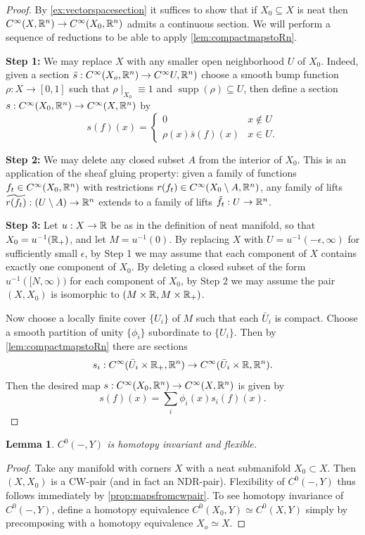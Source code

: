 \documentclass{article}
\newtheorem{lemma}[theorem]{Lemma}
\newtheorem{proposed work}[theorem]{Proposed Work}
\begin{document}
\begin{proof}
  By \ref{ex:vectorspacesection} it suffices to show that if
  $X_0\subseteq X$ is neat then
  $C^\infty(X,\mathbb R^n) \to C^\infty(X_0, \mathbb R^n)$ admits a continuous
  section. We will perform a sequence of reductions to be able to
  apply \ref{lem:compactmapstoRn}.

  {\bf Step 1:} We may replace $X$ with any smaller open neighborhood
  $U$ of $X_0$. Indeed, given a section $\bar s: C^\infty(X_o,
  \mathbb R^n) \to C^\infty U, \mathbb R^n)$ choose a smooth bump function
  $\rho: X\to [0,1]$ such that $\rho\mid_{X_0} \equiv 1$ and
  $\operatorname{supp}(\rho)\subseteq U$, then define a section
  $s:C^\infty(X_0, \mathbb R^n) \to C^\infty(X, \mathbb R^n)$ by
  \[
    s(f)(x) = \begin{cases} 0 &x\notin U\\ \rho(x) \bar s(f)(x) & x\in
      U. 
    \end{cases}
  \]

  {\bf Step 2:} We may delete any closed subset $A$ from the interior
  of $X_0$. This is an application of the sheaf gluing property: given
  a family of functions $f_t \in C^\infty(X_0, \mathbb R^n)$ with
  restrictions $r(f_t) \in C^\infty(X_0\setminus A, \mathbb R^n)$, any family
  of lifts $\widetilde{r(f_t)} : (U\setminus A)\to \mathbb R^n$ extends to a
  family of lifts $\tilde f_t : U\to \mathbb R^n$.

  {\bf Step 3:} Let $u:X\to \mathbb R$ be as in the definition of neat
  manifold, so that $X_0 = u^{-1}(\mathbb R_+)$, and let $M = u^{-1}(0)$. By
  replacing $X$ with $U = u^{-1}(-\epsilon,\infty)$ for sufficiently
  small $\epsilon$, by Step 1 we may assume that each component of $X$
  contains exactly one component of $X_0$. By deleting a closed subset
  of the form $u^{-1}([N,\infty))$ for each component of $X_0$, by
  Step 2 we may assume the pair $(X, X_0)$ is isomorphic to $(M\times
  \mathbb R, M\times \mathbb R_+)$.

  Now choose a locally finite cover $\{U_i\}$ of $M$ such that each
  $\bar U_i$ is compact. Choose a smooth partition of unity
  $\{\phi_i\}$ subordinate to $\{U_i\}$. Then by
  \ref{lem:compactmapstoRn} there are sections 
  \[ s_i : C^\infty(\bar U_i\times \mathbb R_+, \mathbb R^n) \to C^\infty(\bar
    U_i\times \mathbb R, \mathbb R^n).\]
  Then the desired map $s: C^\infty(X_0,\mathbb R^n) \to C^\infty(X, \mathbb R^n)$
  is given by
  \[
    s(f)(x) = \sum_i \phi_i(x) s_i(f)(x).
  \]
\end{proof}

\begin{lemma} \label{lem:c0functorisnice}
  $C^0(-, Y)$ is homotopy invariant and flexible.
\end{lemma}
\begin{proof}
  Take any manifold with corners $X$ with a neat submanifold
  $X_0 \subset X$. Then $(X, X_0)$ is a CW-pair (and in fact an
  NDR-pair).
  Flexibility of $C^0(-,Y)$ thus follows immediately by
  \ref{prop:mapsfromcwpair}. To see homotopy invariance of $C^0(-,Y)$,
  define a homotopy equivalence $C^0(X_0, Y) \simeq C^0(X,Y)$ simply
  by precomposing with a homotopy equivalence $X_o \simeq X$.
\end{proof}
\end{document}
